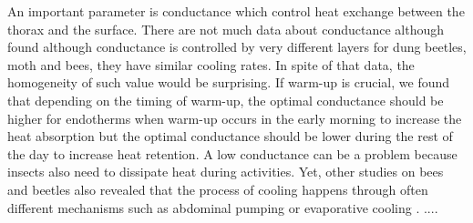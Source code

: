 An important parameter is conductance which control heat exchange between the thorax and the surface.
There are not much data about conductance although  \citet{Bartholomew1978} found although conductance is controlled by very different layers for dung beetles, moth and bees, they have similar cooling rates. %
In spite of that data, the homogeneity of such value would be surprising. %
If warm-up is crucial, we found that depending on the timing of warm-up, the optimal conductance should be higher for endotherms when warm-up occurs in the early morning  to increase the heat absorption but the optimal conductance should be lower during the rest of the day to increase heat retention.
A low conductance  can be a problem because insects also need to dissipate heat during activities.
Yet,  other studies on bees and beetles also revealed that the process of cooling happens through often different mechanisms such as abdominal pumping or evaporative cooling \citep{Heinrich1979, Verdu2012}.
....

